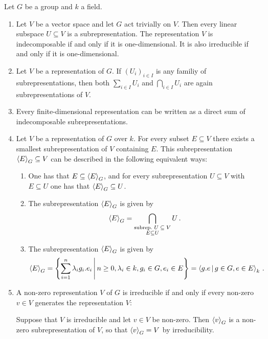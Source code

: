 \begin{example}
  Let $G$ be a group and $k$ a field.
  \begin{enumerate}
    \item
      Let $V$ be a vector space and let $G$ act trivially on $V$.
      Then every linear subspace $U \subseteq V$ is a subrepresentation.
      The representation $V$ is indecomposable if and only if it is one-dimensional.
      It is also irreducible if and only if it is one-dimensional.
    \item
      Let $V$ be a representation of $G$.
      If $(U_i)_{i \in I}$ is any familiy of subrepresentations, then both $\sum_{i \in I} U_i$ and $\bigcap_{i \in I} U_i$ are again subrepresentations of $V$.
    \item
      Every finite-dimensional representation can be written as a direct sum of indecomposable subrepresentations.
    \item
      Let $V$ be a representation of $G$ over $k$.
      For every subset $E \subseteq V$ there exists a smallest subrepresentation of $V$ containing $E$.
      This subrepresentation $\left\langle E \right\rangle_G \subseteq V$ can be described in the following equivalent ways:
      \begin{enumerate}
        \item
          One has that $E \subseteq \left\langle E \right\rangle_G$, and for every subrepresentation $U \subseteq V$ with $E \subseteq U$ one has that $\left\langle E \right\rangle_G \subseteq U$.
        \item
          The subrepresentation $\left\langle E \right\rangle_G$ is given by
          \[
              \left\langle E \right\rangle_G
            = \bigcap_{\substack{\text{subrep.\ $U \subseteq V$} \\ E \subseteq U}} U \,.
          \]
        \item
          The subrepresentation $\left\langle E \right\rangle_G$ is given by
          \[
              \gen{E}_G
            = \left\{
                \sum_{i=1}^n \lambda_i g_i.e_i
              \suchthat*
                n \geq 0,
                \lambda_i \in k,
                g_i \in G,
                e_i \in E
              \right\}
            = \gen{g.e \suchthat g \in G, e \in E}_k \,.
          \]
      \end{enumerate}
    \item
      A non-zero representation $V$ of $G$ is irreducible if and only if every non-zero $v \in V$ generates the representation $V$:
      
      Suppose that $V$ is irreducible and let $v \in V$ be non-zero.
      Then $\left\langle v \right\rangle_G$ is a non-zero subrepresentation of $V$, so that $\left\langle v \right\rangle_G = V$ by irreducibility.
      

\end{enumerate}
\end{example}
